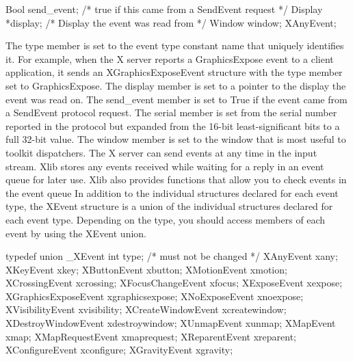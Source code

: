 \documentclass{report}
\begin{document}
\begin{itemize}
\begin{cppcode}
{                    Bool send_event;        /* true if this came from a SendEvent request */
                    Display *display;       /* Display the event was read from */
                    Window window;
                } XAnyEvent;
            \end{cppcode}
            \bigbreak \noindent 
            The type member is set to the event type constant name that uniquely identifies it. For example, when the X server reports a GraphicsExpose event to a client application, it sends an XGraphicsExposeEvent structure with the type member set to GraphicsExpose. The display member is set to a pointer to the display the event was read on. The send\_event member is set to True if the event came from a SendEvent protocol request. The serial member is set from the serial number reported in the protocol but expanded from the 16-bit least-significant bits to a full 32-bit value. The window member is set to the window that is most useful to toolkit dispatchers.
            \bigbreak \noindent 
            The X server can send events at any time in the input stream. Xlib stores any events received while waiting for a reply in an event queue for later use. Xlib also provides functions that allow you to check events in the event queue
            \bigbreak \noindent 
            In addition to the individual structures declared for each event type, the XEvent structure is a union of the individual structures declared for each event type. Depending on the type, you should access members of each event by using the XEvent union.
            \bigbreak \noindent 
            \begin{cppcode}
                typedef union _XEvent {
                    int type;           /* must not be changed */
                    XAnyEvent xany;
                    XKeyEvent xkey;
                    XButtonEvent xbutton;
                    XMotionEvent xmotion;
                    XCrossingEvent xcrossing;
                    XFocusChangeEvent xfocus;
                    XExposeEvent xexpose;
                    XGraphicsExposeEvent xgraphicsexpose;
                    XNoExposeEvent xnoexpose;
                    XVisibilityEvent xvisibility;
                    XCreateWindowEvent xcreatewindow;
                    XDestroyWindowEvent xdestroywindow;
                    XUnmapEvent xunmap;
                    XMapEvent xmap;
                    XMapRequestEvent xmaprequest;
                    XReparentEvent xreparent;
                    XConfigureEvent xconfigure;
                    XGravityEvent xgravity;
}
\end{cppcode}
\end{itemize}
\end{document}

